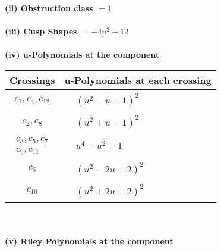 \documentclass[1p]{elsarticle_modified}
\theoremstyle{definition}
\begin{document}
\flushleft \textbf{(ii) Obstruction class $= 1$}\\~\\
\flushleft \textbf{(iii) Cusp Shapes $= -4 u^2+12$}\\~\\
\newpage\renewcommand{\arraystretch}{1}
\flushleft \textbf{(iv) u-Polynomials at the component}\newline \\
\begin{tabular}{m{50pt}|m{274pt}}
Crossings & \hspace{64pt}u-Polynomials at each crossing \\
\hline $$\begin{aligned}c_{1},c_{4},c_{12}\end{aligned}$$&$\begin{aligned}
&(u^2- u+1)^2
\end{aligned}$\\
\hline $$\begin{aligned}c_{2},c_{8}\end{aligned}$$&$\begin{aligned}
&(u^2+u+1)^2
\end{aligned}$\\
\hline $$\begin{aligned}c_{3},c_{5},c_{7}\\c_{9},c_{11}\end{aligned}$$&$\begin{aligned}
&u^4- u^2+1
\end{aligned}$\\
\hline $$\begin{aligned}c_{6}\end{aligned}$$&$\begin{aligned}
&(u^2-2 u+2)^2
\end{aligned}$\\
\hline $$\begin{aligned}c_{10}\end{aligned}$$&$\begin{aligned}
&(u^2+2 u+2)^2
\end{aligned}$\\
\hline
\end{tabular}\\~\\
\newpage\renewcommand{\arraystretch}{1}
\flushleft \textbf{(v) Riley Polynomials at the component}\newline \\
\end{document}
